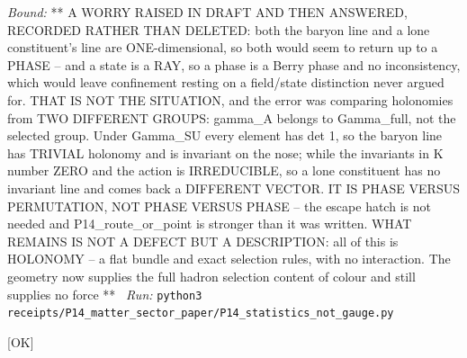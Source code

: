 \begin{description}
 \emph{Bound:} ** A WORRY RAISED IN DRAFT AND THEN ANSWERED, RECORDED RATHER THAN DELETED: both the baryon line and a lone constituent's line are ONE-dimensional, so both would seem to return up to a PHASE -- and a state is a RAY, so a phase is a Berry phase and no inconsistency, which would leave confinement resting on a field/state distinction never argued for. THAT IS NOT THE SITUATION, and the error was comparing holonomies from TWO DIFFERENT GROUPS: gamma\_A belongs to Gamma\_full, not the selected group. Under Gamma\_SU every element has det 1, so the baryon line has TRIVIAL holonomy and is invariant on the nose; while the invariants in K number ZERO and the action is IRREDUCIBLE, so a lone constituent has no invariant line and comes back a DIFFERENT VECTOR. IT IS PHASE VERSUS PERMUTATION, NOT PHASE VERSUS PHASE -- the escape hatch is not needed and P14\_route\_or\_point is stronger than it was written. WHAT REMAINS IS NOT A DEFECT BUT A DESCRIPTION: all of this is HOLONOMY -- a flat bundle and exact selection rules, with no interaction. The geometry now supplies the full hadron selection content of colour and still supplies no force **
\ \emph{Run:} \texttt{python3 receipts/P14\_matter\_sector\_paper/P14\_statistics\_not\_gauge.py}
\item[\rcptlabel{P14_two_rank_threes}{P14R33}\textbf{P14R33}\quad\texttt{P14\_two\_rank\_threes}]\hfill\textsf{[OK]}\\

\end{description}
